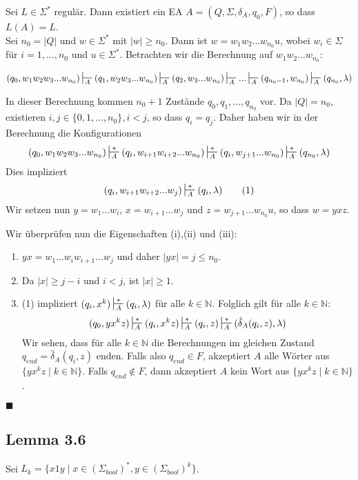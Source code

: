 \documentclass[a4paper, 11pt]{article}
\def\N{\mathbb{N}}
\begin{document}
    Sei $L \in \Sigma^*$ regulär. Dann existiert ein EA $A= (Q, \Sigma, \delta_A, q_0, F)$, so dass $L(A) = L$.
    \\Sei $n_0 = |Q|$ und $w \in \Sigma^*$ mit $|w| \geq n_0$. Dann ist $w = w_1w_2...w_{n_0}u$, wobei $w_i \in \Sigma$ für $i = 1, ..., n_0$ und $u \in \Sigma^*$. Betrachten wir die Berechnung auf $w_1w_2...w_{n_0}$:

    $$(q_0, w_1w_2w_3...w_{n_0}) \sststile{A}{} (q_1, w_2w_3...w_{n_0}) \sststile{A}{} (q_2, w_3...w_{n_0}) \sststile{A}{} ... \sststile{A}{} (q_{n_0-1}, w_{n_0}) \sststile{A}{} (q_{n_0}, \lambda)$$

    In dieser Berechnung kommen $n_0 + 1$ Zustände $q_0,q_1, ..., q_{n_0}$ vor. Da $|Q| = n_0$, existieren $i, j \in \{0, 1, ..., n_0\}, i < j$, so dass $q_i = q_j$. Daher haben wir in der Berechnung die Konfigurationen
    $$(q_0, w_1w_2w_3...w_{n_0}) \sststile{A}{*} (q_i, w_{i+1}w_{i+2}...w_{n_0}) \sststile{A}{*} (q_i, w_{j+1}...w_{n_0}) \sststile{A}{*} (q_{n_0}, \lambda)$$
    Dies impliziert
    $$(q_i, w_{i+1}w_{i+2}...w_j) \sststile{A}{*} (q_i, \lambda) \qquad (1)$$
    Wir setzen nun $y = w_1...w_i$, $x = w_{i+1}...w_j$ und $z = w_{j+1}...w_{n_0}u$, so dass $w = yxz$.

    Wir überprüfen nun die Eigenschaften (i),(ii) und (iii):
    \begin{enumerate}[label = (\roman*)]
        \item $yx = w_1...w_iw_{i+1}...w_j$ und daher $|yx| = j \leq n_0$.
        \item Da $|x| \geq j-i$ und $i < j$, ist $|x| \geq 1$.
        \item (1) impliziert $(q_i, x^k) \sststile{A}{*} (q_i, \lambda)$ für alle $k \in \N$.
        Folglich gilt für alle $k \in \N$:
        $$(q_0, yx^kz) \sststile{A}{*} (q_i, x^kz) \sststile{A}{*} (q_i, z) \sststile{A}{*} (\hat{\delta}_A(q_i, z), \lambda)$$
        Wir sehen, dass für alle $k \in \N$ die Berechnungen im gleichen Zustand $q_{end} = \hat{\delta}_A(q_i, z)$ enden. Falls also $q_{end} \in F$, akzeptiert $A$ alle Wörter aus $\{yx^kz \mid k \in \N\}$. Falls $q_{end}\notin F$, dann akzeptiert $A$ kein Wort aus $\{yx^kz \mid k \in \N\}$.
    \end{enumerate}
    \hspace*{0pt}\hfill$\blacksquare$

    \subsection*{Lemma 3.6}
    Sei $L_k = \{x1y \mid x \in (\Sigma_{bool})^*, y \in (\Sigma_{bool})^k\}$.
\end{document}
